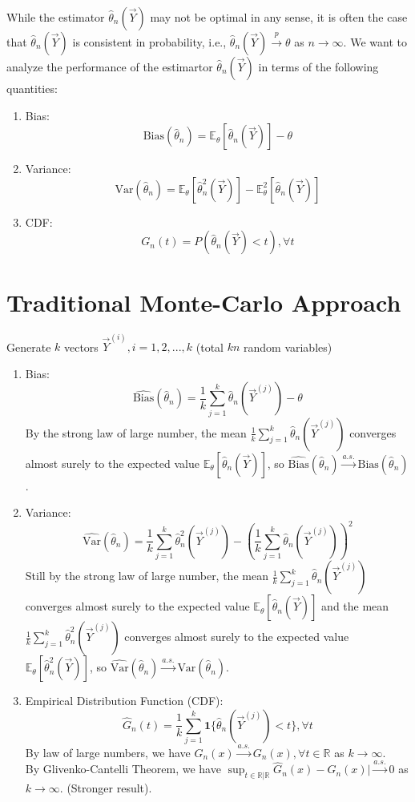 \documentclass[11pt]{elegantbook}
\begin{document}
While the estimator $\hat{\theta}_n(\vec{Y})$ may not be optimal in any sense, it is often the case that $\hat{\theta}_n(\vec{Y})$ is consistent in probability, i.e., $\hat{\theta}_n(\vec{Y}) \stackrel{p}{\longrightarrow} \theta$ as $n \rightarrow \infty$. We want to analyze the performance of the estimartor $\hat{\theta}_n(\vec{Y})$ in terms of the following quantities:
\begin{enumerate}[(1).]
    \item Bias: $$\text{Bias}(\hat{\theta}_n)= \mathbb{E}_{\theta}[\hat{\theta}_n(\vec{Y})]-\theta$$
    \item Variance: $$\text{Var}(\hat{\theta}_n)=\mathbb{E}_{\theta}[\hat{\theta}_n^2(\vec{Y})]-\mathbb{E}_{\theta}^2[\hat{\theta}_n(\vec{Y})]$$
    \item CDF: $$G_{n}(t)=P(\hat{\theta}_n(\vec{Y})<t),\forall t$$
\end{enumerate}

\section{Traditional Monte-Carlo Approach}
Generate $k$ vectors $\vec{Y}^{(i)},i=1,2,...,k$ (total $kn$ random variables)
\begin{enumerate}[(1).]
    \item Bias: $$\widehat{\text{Bias}}(\hat{\theta}_n)=\frac{1}{k}\sum_{j=1}^k \hat{\theta}_n(\vec{Y}^{(j)})-\theta$$
    By the strong law of large number, the mean $\frac{1}{k}\sum_{j=1}^k \hat{\theta}_n(\vec{Y}^{(j)})$ converges almost surely to the expected value $\mathbb{E}_{\theta}[\hat{\theta}_n(\vec{Y})]$, so $\widehat{\text{Bias}}(\hat{\theta}_n) \stackrel{a.s.}{\longrightarrow} \text{Bias}(\hat{\theta}_n)$.
    \item Variance: $$\widehat{\text{Var}}(\hat{\theta}_n)=\frac{1}{k}\sum_{j=1}^k \hat{\theta}^2_n(\vec{Y}^{(j)})-\left(\frac{1}{k}\sum_{j=1}^k \hat{\theta}_n(\vec{Y}^{(j)})\right)^2$$
    Still by the strong law of large number, the mean $\frac{1}{k}\sum_{j=1}^k \hat{\theta}_n(\vec{Y}^{(j)})$ converges almost surely to the expected value $\mathbb{E}_{\theta}[\hat{\theta}_n(\vec{Y})]$ and the mean $\frac{1}{k}\sum_{j=1}^k \hat{\theta}^2_n(\vec{Y}^{(j)})$ converges almost surely to the expected value $\mathbb{E}_{\theta}[\hat{\theta}^2_n(\vec{Y})]$, so $\widehat{\text{Var}}(\hat{\theta}_n) \stackrel{a.s.}{\longrightarrow} \text{Var}(\hat{\theta}_n)$.
    \item Empirical Distribution Function (CDF): $$\hat{G}_{n}(t)=\frac{1}{k}\sum_{j=1}^k \mathbf{1}\{\hat{\theta}_n(\vec{Y}^{(j)})<t\},\forall t$$
    By law of large numbers, we have $\hat{G}_n(x) \stackrel{a.s.}{\longrightarrow} G_n(x),\forall t\in \mathbb{R}$ as $k \rightarrow \infty$.\\
    By Glivenko-Cantelli Theorem, we have $\sup_{t\in \mathbb{R} |\mathbb{R}}\hat{G}_n(x) - G_n(x)| \stackrel{a.s.}{\longrightarrow} 0$ as $k \rightarrow \infty$. (Stronger result).
\end{enumerate}
\end{document}
